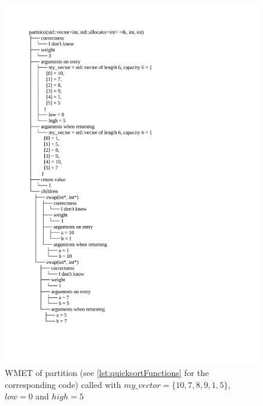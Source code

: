 \begin{figure}[p]
\centering
    \caption{WMET of partition (see \ref{lst:quicksortFunctions} for the corresponding code) called with \(my\_vector = \{10, 7, 8, 9, 1, 5\}\), \(low = 0\) and \(high = 5\)}
    \label{fig:partitionTree}
\includegraphics[width=\textwidth,height=\textheight,keepaspectratio]{Imagenes/Vectorial/partitionTree.pdf}
\end{figure}


